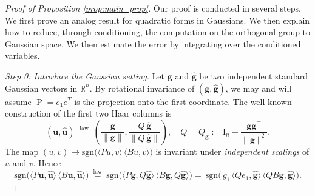 \documentclass[10pt,a4paper]{amsart}
\newcommand\R{\mathbb{R}}
\newcommand\bg{\bm{g}}
\newcommand\bu{\bm{u}}
\newcommand\hg{\hat{\bm g}}
\newcommand\hu{\hat{\bm u}}
\newcommand\proj{{\operatorname{P}}}
\begin{document}
\begin{proof}[Proof of Proposition \ref{prop:main_prop}]
Our proof is conducted in several steps. We first prove an analog result for quadratic forms in Gaussians. We then explain how to reduce, through conditioning, the computation on the orthogonal group to Gaussian space. We then estimate the error by integrating over the conditioned variables.

\emph{Step 0: Introduce the Gaussian setting.} Let $\bg$ and $\hg$ be two independent standard Gaussian vectors in $\R^n$. By rotational invariance of $(\bg,\hg)$, we may and will assume $\proj=e_{1}e_{1}^T$ is the projection onto the first coordinate. 
The well-known construction of the first two Haar columns is
\[
(\bu,\hu) \;\stackrel{\mathrm{law}}=\; \left(\frac{\bg}{\|\bg\|}, \frac{Q\,\hg}{\|Q\,\hg\|}\right),
\quad
Q=Q_{\bg}:=\mathrm{I}_n-\frac{\bg\bg^\top}{\|\bg\|^2}.
\]
The map
$(u,v)\mapsto \mathrm{sgn}\big(\langle Pu,v\rangle\,\langle Bu,v\rangle\big)$
is invariant under \emph{independent scalings} of $u$ and $v$.
Hence
\[
\mathrm{sgn}\!\big(\langle P\bu,\hu\rangle\,\langle B\bu,\hu\rangle\big)
\ \stackrel{\mathrm{law}}=\ 
\mathrm{sgn}\!\big(\langle P\bg,Q\hg\rangle\,\langle B\bg,Q\hg\rangle\big)=\ 
\mathrm{sgn}\!\big(\, g_{1}\,\langle Qe_1,\hg\rangle\,\langle QB\bg,\hg\rangle\big).
\]


\end{proof}
\end{document}
